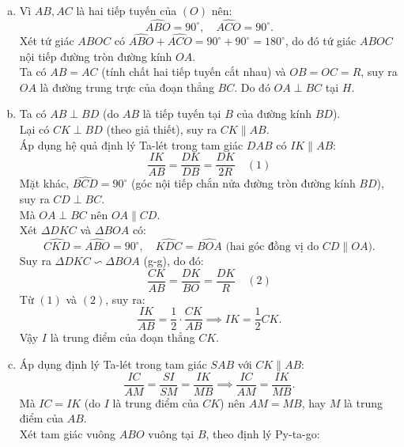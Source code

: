 \begin{bt}
{\begin{center}
	\end{center}
	\begin{enumerate}[a)]
		\item Vì $AB, AC$ là hai tiếp tuyến của $(O)$ nên:
		$$\widehat{ABO} = 90^\circ, \quad \widehat{ACO} = 90^\circ.$$
		Xét tứ giác $ABOC$ có $\widehat{ABO} + \widehat{ACO} = 90^\circ + 90^\circ = 180^\circ$, do đó tứ giác $ABOC$ nội tiếp đường tròn đường kính $OA$.\\
		Ta có $AB = AC$ (tính chất hai tiếp tuyến cắt nhau) và $OB = OC = R$, suy ra $OA$ là đường trung trực của đoạn thẳng $BC$. Do đó $OA \perp BC$ tại $H$.
		\item Ta có $AB \perp BD$ (do $AB$ là tiếp tuyến tại $B$ của đường kính $BD$).\\
		Lại có $CK \perp BD$ (theo giả thiết), suy ra $CK \parallel AB$.\\
		Áp dụng hệ quả định lý Ta-lét trong tam giác $DAB$ có $IK \parallel AB$:
		$$\frac{IK}{AB} = \frac{DK}{DB} = \frac{DK}{2R} \quad (1)$$
		Mặt khác, $\widehat{BCD} = 90^\circ$ (góc nội tiếp chắn nửa đường tròn đường kính $BD$), suy ra $CD \perp BC$.\\
		Mà $OA \perp BC$ nên $OA \parallel CD$.\\
		Xét $\Delta DKC$ và $\Delta BOA$ có:
		$$\widehat{CKD} = \widehat{ABO} = 90^\circ, \quad \widehat{KDC} = \widehat{BOA}\text{ (hai góc đồng vị do } CD \parallel OA\text{)}.$$
		Suy ra $\Delta DKC \backsim \Delta BOA$ (g-g), do đó:
		$$\frac{CK}{AB} = \frac{DK}{BO} = \frac{DK}{R} \quad (2)$$
		Từ $(1)$ và $(2)$, suy ra:
		$$\frac{IK}{AB} = \frac{1}{2} \cdot \frac{CK}{AB} \implies IK = \frac{1}{2}CK.$$
		Vậy $I$ là trung điểm của đoạn thẳng $CK$.
		\item Áp dụng định lý Ta-lét trong tam giác $SAB$ với $CK \parallel AB$:
		$$\frac{IC}{AM} = \frac{SI}{SM} = \frac{IK}{MB} \implies \frac{IC}{AM} = \frac{IK}{MB}.$$
		Mà $IC = IK$ (do $I$ là trung điểm của $CK$) nên $AM = MB$, hay $M$ là trung điểm của $AB$.\\
		Xét tam giác vuông $ABO$ vuông tại $B$, theo định lý Py-ta-go:

\end{enumerate}}
\end{bt}
